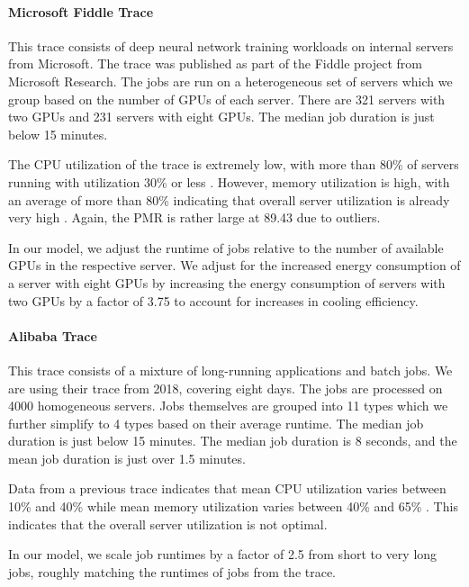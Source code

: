\paragraph{Microsoft Fiddle Trace \cite{Jeon2019}} This trace consists of deep neural network training workloads on internal servers from Microsoft. The trace was published as part of the Fiddle project from Microsoft Research. The jobs are run on a heterogeneous set of servers which we group based on the number of GPUs of each server. There are 321 servers with two GPUs and 231 servers with eight GPUs. The median job duration is just below 15 minutes.

The CPU utilization of the trace is extremely low, with more than 80\% of servers running with utilization 30\% or less \cite{Santhanam2019}. However, memory utilization is high, with an average of more than 80\% indicating that overall server utilization is already very high \cite{Santhanam2019}. Again, the PMR is rather large at 89.43 due to outliers.

In our model, we adjust the runtime of jobs relative to the number of available GPUs in the respective server. We adjust for the increased energy consumption of a server with eight GPUs by increasing the energy consumption of servers with two GPUs by a factor of 3.75 to account for increases in cooling efficiency.

\paragraph{Alibaba Trace \cite{Alibaba2018}} This trace consists of a mixture of long-running applications and batch jobs. We are using their trace from 2018, covering eight days. The jobs are processed on 4000 homogeneous servers. Jobs themselves are grouped into 11 types which we further simplify to 4 types based on their average runtime. The median job duration is just below 15 minutes. The median job duration is 8 seconds, and the mean job duration is just over 1.5 minutes.

Data from a previous trace indicates that mean CPU utilization varies between 10\% and 40\% while mean memory utilization varies between 40\% and 65\% \cite{Lu2017}. This indicates that the overall server utilization is not optimal.

In our model, we scale job runtimes by a factor of 2.5 from short to very long jobs, roughly matching the runtimes of jobs from the trace.

